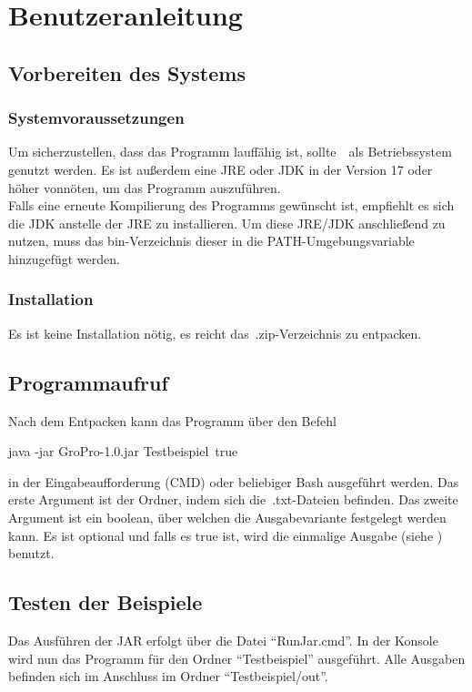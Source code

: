 \chapter{Benutzeranleitung}\label{ch:benutzeranleitung}


\section{Vorbereiten des Systems}\label{sec:vorbereiten-des-systems}

\subsection{Systemvoraussetzungen}\label{subsec:systemvoraussetzungen}
Um sicherzustellen, dass das Programm lauffähig ist, sollte~\Betriebssystem~als Betriebssystem genutzt werden.
Es ist außerdem eine JRE oder JDK in der Version 17 oder höher vonnöten, um das Programm auszuführen.\\
Falls eine erneute Kompilierung des Programms gewünscht ist, empfiehlt es sich die JDK anstelle der JRE zu installieren.
Um diese JRE/JDK anschließend zu nutzen, muss das bin-Verzeichnis dieser in die PATH-Umgebungsvariable hinzugefügt werden.
\subsection{Installation}\label{subsec:installation}
Es ist keine Installation nötig, es reicht das~.zip-Verzeichnis zu entpacken.

\section{Programmaufruf}\label{sec:programmaufruf}
Nach dem Entpacken kann das Programm über den Befehl
\begin{center}
    \colorbox{gray!20}{
        \begin{minipage}{0.9\textwidth}
            java -jar GroPro-1.0.jar \grqq Testbeispiel\grqq~\grqq true\grqq
        \end{minipage}
    }
\end{center}
in der Eingabeaufforderung (CMD) oder beliebiger Bash ausgeführt werden.
Das erste Argument ist der Ordner, indem sich die~.txt-Dateien befinden.
Das zweite Argument ist ein boolean, über welchen die Ausgabevariante festgelegt werden kann.
Es ist optional und falls es true ist, wird die einmalige Ausgabe (siehe ) benutzt.
\section{Testen der Beispiele}\label{sec:testen-der-beispiele}
Das Ausführen der JAR erfolgt über die Datei \enquote{RunJar.cmd}.
In der Konsole wird nun das Programm für den Ordner \enquote{Testbeispiel} ausgeführt.
Alle Ausgaben befinden sich im Anschluss im Ordner \enquote{Testbeispiel/out}.

